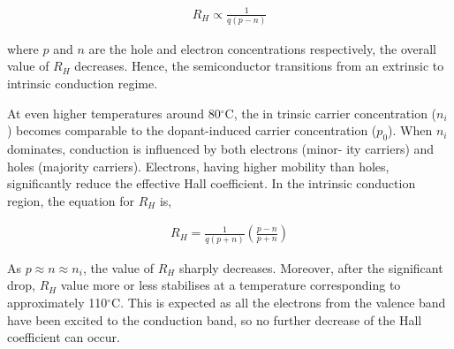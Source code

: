 \begin{align}
    R_H \propto \frac{1}{q(p-n)}
\end{align}

where $p$ and $n$ are the  hole and electron concentrations respectively, the overall value of $R_H$ decreases. Hence, the semiconductor transitions from an extrinsic to intrinsic conduction regime.

At even higher temperatures around 80$^\circ$C, the in
trinsic carrier concentration ($n_i$) becomes comparable to the dopant-induced carrier concentration ($p_0$). When $n_i$ dominates,
conduction is influenced by both electrons (minor-
ity carriers) and holes (majority carriers). Electrons,
having higher mobility than holes, significantly reduce the effective Hall coefficient. In the intrinsic conduction region, the equation for $R_H$ is,

\begin{align}
    R_H = \frac{1}{q(p+n)}\left(\frac{p-n}{p+n}\right)
\end{align}

As $p\approx n \approx n_i$, the value of $R_H$ sharply decreases. Moreover, after the significant drop, $R_H$ value more or less stabilises at a temperature corresponding to approximately 110$^\circ$C. This is expected as all the electrons from the valence band have been excited to the conduction band, so no further decrease of the Hall coefficient can occur.